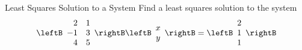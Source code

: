 \begin{example}{Least Squares Solution to a System}{}
Find a least squares solution to the system 
\begin{equation*}
\leftB
\begin{array}{rr}
2 & 1 \\ 
-1 & 3 \\ 
4 & 5
\end{array}
\rightB \leftB 
\begin{array}{c}
x \\ 
y
\end{array}
\rightB =\leftB 
\begin{array}{c}
2 \\ 
1 \\ 
1
\end{array}
\rightB
\end{equation*}
\end{example}

